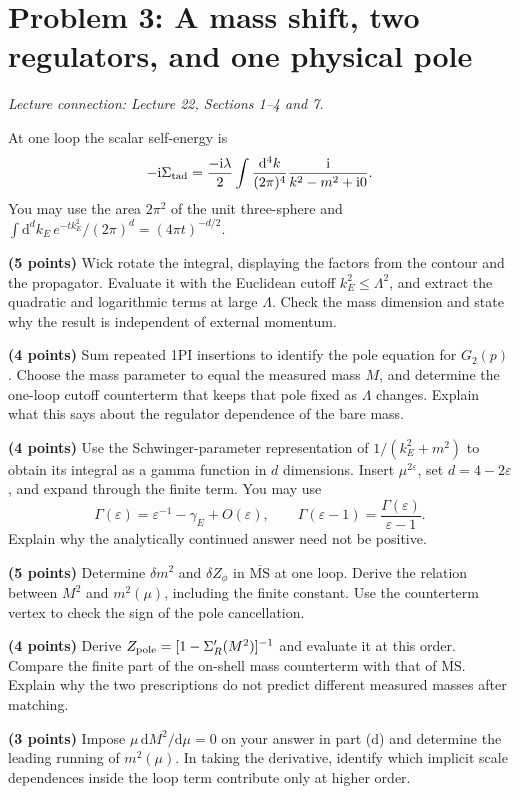 \documentclass[11pt]{article}
\newcommand{\dd}{\mathrm d}
\newcommand{\ii}{\mathrm i}
\newcommand{\eps}{\varepsilon}
\newcommand{\MSbar}{\overline{\mathrm{MS}}}
\newcommand{\problem}[2]{\clearpage\section*{\color{qftblue}Problem #1: #2}}
\newcommand{\connection}[1]{{\small\textit{Lecture connection: #1}\par}\medskip}
\begin{document}
\problem{3}{A mass shift, two regulators, and one physical pole}
\connection{Lecture 22, Sections 1--4 and 7.}
At one loop the scalar self-energy is
\[
 -\ii\Sigma_{\rm tad}=\frac{-\ii\lambda}{2}
 \int\frac{\dd^4k}{(2\pi)^4}\frac{\ii}{k^2-m^2+\ii0}.
\]
You may use the area \(2\pi^2\) of the unit three-sphere and
\(\int\dd^dk_E\,e^{-t k_E^2}/(2\pi)^d=(4\pi t)^{-d/2}\).
\begin{parts}
\item \textbf{(5 points)} Wick rotate the integral, displaying the
factors from the contour and the propagator. Evaluate it with the
Euclidean cutoff \(k_E^2\leq\Lambda^2\), and extract the quadratic
and logarithmic terms at large \(\Lambda\). Check the mass dimension
and state why the result is independent of external momentum.

\item \textbf{(4 points)} Sum repeated 1PI insertions to identify the
pole equation for \(G_2(p)\). Choose the mass parameter to equal the
measured mass \(M\), and determine the one-loop cutoff counterterm
that keeps that pole fixed as \(\Lambda\) changes. Explain what this
says about the regulator dependence of the bare mass.

\item \textbf{(4 points)} Use the Schwinger-parameter representation
of \(1/(k_E^2+m^2)\) to obtain its integral as a gamma function in
\(d\) dimensions. Insert \(\mu^{2\eps}\), set \(d=4-2\eps\), and
expand through the finite term. You may use
\[
 \Gamma(\eps)=\eps^{-1}-\gamma_E+O(\eps),\qquad
 \Gamma(\eps-1)=\frac{\Gamma(\eps)}{\eps-1}.
\]
Explain why the analytically continued answer need not be positive.

\item \textbf{(5 points)} Determine \(\delta m^2\) and
\(\delta Z_\phi\) in \(\MSbar\) at one loop. Derive the relation
between \(M^2\) and \(m^2(\mu)\), including the finite constant.
Use the counterterm vertex to check the sign of the pole cancellation.

\item \textbf{(4 points)} Derive
\(Z_{\rm pole}=[1-\Sigma_R'(M^2)]^{-1}\) and evaluate it at this
order. Compare the finite part of the on-shell mass counterterm with
that of \(\MSbar\). Explain why the two prescriptions do not predict
different measured masses after matching.

\item \textbf{(3 points)} Impose \(\mu\,\dd M^2/\dd\mu=0\) on your
answer in part (d) and determine the leading running of \(m^2(\mu)\).
In taking the derivative, identify which implicit scale dependences
inside the loop term contribute only at higher order.
\end{parts}
\end{document}
